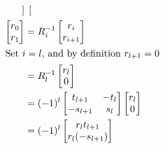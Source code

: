 \documentclass[11pt,a4paper]{article}
\begin{document}
\begin{enumerate}
\begin{enumerate}
\begin{align*}
\begin{bmatrix}
                                                                  \end{bmatrix}                                \\
                        \begin{bmatrix}
                            r_0 \\ r_1
                        \end{bmatrix}                         & = R^{-1}_i\begin{bmatrix}
                                                                              r_i \\ r_{i + 1}
                                                                          \end{bmatrix}                        \\
                        \intertext{Set $i = l$, and by definition $r_{l + 1} = 0$}
                                                                & = R^{-1}_l\begin{bmatrix}
                                                                                r_l \\ 0
                                                                            \end{bmatrix}                       \\
                                                                & = (-1)^l\begin{bmatrix}
                                                                              t_{l + 1} & -t_l \\ -s_{l + 1} & s_l
                                                                          \end{bmatrix}\begin{bmatrix}
                                                                                           r_l \\ 0
                                                                                       \end{bmatrix}    \\
                                                                & = (-1)^l\begin{bmatrix}
                                                                              r_l t_{l + 1} \\ r_l(-s_{l + 1})
                                                                          \end{bmatrix}        \\

\end{align*}
\end{enumerate}
\end{enumerate}
\end{document}
